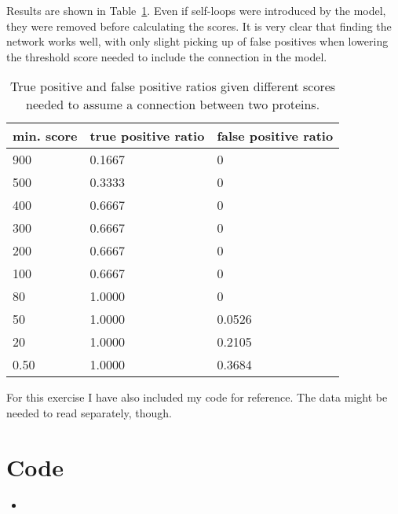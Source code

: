 \documentclass{article}
\newcommand{\matlabscript}[2]
  {\begin{itemize}\item[]\end{itemize}}
\begin{document}
\begin{spacing}{1.1}
{Results are shown in Table~\ref{tab:var}. Even if self-loops were introduced by the
model, they were removed before calculating the scores. It is very clear that
finding the network works well, with only slight picking up of false positives
when lowering the threshold score needed to include the connection in the
model. 
\begin{table}[h]
    \centering
    \caption{True positive and false positive ratios given different scores
    needed to assume a connection between two proteins.}
    \label{tab:var}
    \begin{tabular}{lll}
        \toprule
        min. score & true positive ratio & false positive ratio\\
        \midrule
  900  & 0.1667 &       0\\
  500  & 0.3333 &       0\\
  400  & 0.6667 &       0\\
  300  & 0.6667 &       0\\
  200  & 0.6667 &       0\\
  100  & 0.6667 &       0\\
   80  & 1.0000 &       0\\
   50  & 1.0000 &  0.0526\\
   20  & 1.0000 &  0.2105\\
 0.50  & 1.0000 &  0.3684\\
        \bottomrule
    \end{tabular}
\end{table}
}

For this exercise I have also included my code for reference. The data might
be needed to read separately, though.
\clearpage
\appendix
\section{Code}
\matlabscript{assignment2}{}
\end{spacing}


\end{document}
